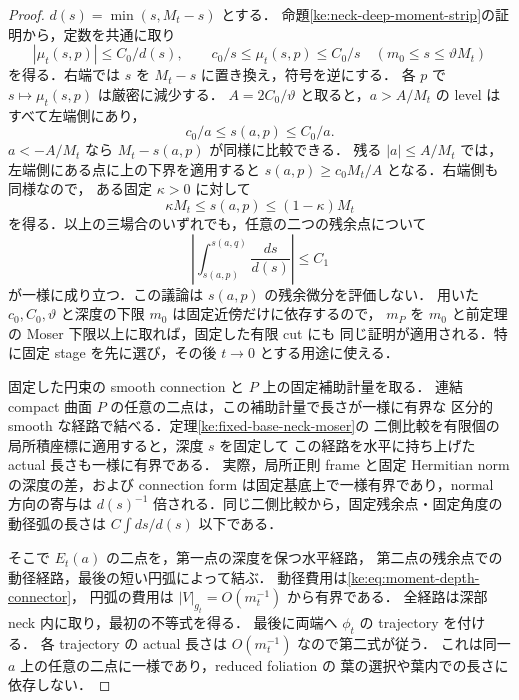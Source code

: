 \begin{proof}
$d(s)=\min(s,M_t-s)$ とする．
命題\ref{ke:neck-deep-moment-strip}の証明から，定数を共通に取り
\[
 |\mu_t(s,p)|\le C_0/d(s),\qquad
 c_0/s\le\mu_t(s,p)\le C_0/s
 \quad(m_0\le s\le\vartheta M_t)
\]
を得る．右端では $s$ を $M_t-s$ に置き換え，符号を逆にする．
各 $p$ で $s\mapsto\mu_t(s,p)$ は厳密に減少する．
$A=2C_0/\vartheta$ と取ると，$a>A/M_t$ の level はすべて左端側にあり，
\[
 c_0/a\le s(a,p)\le C_0/a.
\]
$a<-A/M_t$ なら $M_t-s(a,p)$ が同様に比較できる．
残る $|a|\le A/M_t$ では，左端側にある点に上の下界を適用すると
$s(a,p)\ge c_0M_t/A$ となる．右端側も同様なので，
ある固定 $\kappa>0$ に対して
\[
 \kappa M_t\le s(a,p)\le(1-\kappa)M_t
\]
を得る．以上の三場合のいずれでも，任意の二つの残余点について
\begin{equation}\label{ke:eq:moment-depth-connector}
 \left|\int_{s(a,p)}^{s(a,q)}\frac{ds}{d(s)}\right|\le C_1
\end{equation}
が一様に成り立つ．この議論は $s(a,p)$ の残余微分を評価しない．
用いた $c_0,C_0,\vartheta$ と深度の下限 $m_0$ は固定近傍だけに依存するので，
$m_P$ を $m_0$ と前定理の Moser 下限以上に取れば，固定した有限 cut にも
同じ証明が適用される．特に固定 stage を先に選び，その後 $t\to0$ とする用途に使える．

固定した円束の smooth connection と $P$ 上の固定補助計量を取る．
連結 compact 曲面 $P$ の任意の二点は，この補助計量で長さが一様に有界な
区分的 smooth な経路で結べる．定理\ref{ke:fixed-base-neck-moser}の
二側比較を有限個の局所積座標に適用すると，深度 $s$ を固定して
この経路を水平に持ち上げた actual 長さも一様に有界である．
実際，局所正則 frame と固定 Hermitian norm の深度の差，および
connection form は固定基底上で一様有界であり，normal 方向の寄与は
$d(s)^{-1}$ 倍される．同じ二側比較から，固定残余点・固定角度の
動径弧の長さは $C\int ds/d(s)$ 以下である．

そこで $E_t(a)$ の二点を，第一点の深度を保つ水平経路，
第二点の残余点での動径経路，最後の短い円弧によって結ぶ．
動径費用は\eqref{ke:eq:moment-depth-connector}，
円弧の費用は $|V|_{g_t}=O(m_t^{-1})$ から有界である．
全経路は深部 neck 内に取り，最初の不等式を得る．
最後に両端へ $\phi_t$ の trajectory を付ける．
各 trajectory の actual 長さは $O(m_t^{-1})$ なので第二式が従う．
これは同一 $a$ 上の任意の二点に一様であり，reduced foliation の
葉の選択や葉内での長さに依存しない．
\end{proof}

